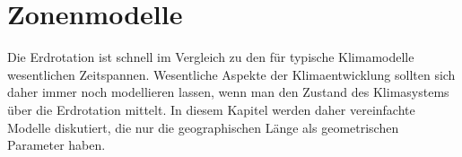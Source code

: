 %
%
%
\chapter{Zonenmodelle\label{chapter:zonenmodelle}}
Die Erdrotation ist schnell im Vergleich zu den für typische Klimamodelle
wesentlichen Zeitspannen.
Wesentliche Aspekte der Klimaentwicklung sollten sich daher immer
noch modellieren lassen, wenn man den Zustand des Klimasystems über
die Erdrotation mittelt.
In diesem Kapitel werden daher vereinfachte Modelle diskutiert,
die nur die geographischen Länge als geometrischen Parameter haben.





